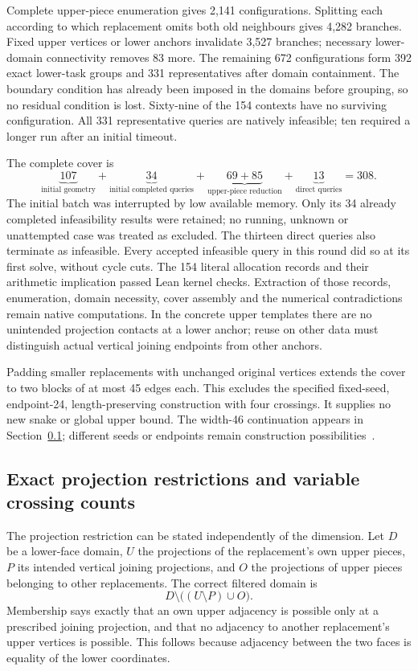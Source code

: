 \documentclass[11pt,a4paper]{article}
\theoremstyle{definition}
\theoremstyle{remark}
\begin{document}
Complete upper-piece enumeration gives 2,141 configurations. Splitting
each according to which replacement omits both old neighbours gives
4,282 branches. Fixed upper vertices or lower anchors invalidate 3,527
branches; necessary lower-domain connectivity removes 83 more. The
remaining 672 configurations form 392 exact lower-task groups and
331 representatives after domain containment. The boundary condition
has already been imposed in the domains before grouping, so no residual
condition is lost. Sixty-nine of the 154 contexts have no surviving
configuration. All 331 representative queries are natively infeasible;
ten required a longer run after an initial timeout.

The complete cover is
\[
\underbrace{107}_{\text{initial geometry}}+
\underbrace{34}_{\text{initial completed queries}}+
\underbrace{69+85}_{\text{upper-piece reduction}}+
\underbrace{13}_{\text{direct queries}}=308.
\]
The initial batch was interrupted by low available memory. Only its 34
already completed infeasibility results were retained; no running,
unknown or unattempted case was treated as excluded. The thirteen
direct queries also terminate as infeasible. Every accepted infeasible
query in this round did so at its first solve, without cycle cuts.
The 154 literal allocation records and their arithmetic implication
passed Lean kernel checks. Extraction of those records, enumeration,
domain necessity, cover assembly and the numerical contradictions remain
native computations. In the concrete upper templates there are no
unintended projection contacts at a lower anchor; reuse on other data
must distinguish actual vertical joining endpoints from other anchors.

Padding smaller replacements with unchanged original vertices extends
the cover to two blocks of at most 45 edges each. This excludes the
specified fixed-seed, endpoint-24, length-preserving construction with
four crossings. It supplies no new snake or global upper bound.
The width-46 continuation appears in Section~\ref{sec:projection229};
different seeds or endpoints remain construction possibilities~\cite{research228}.

\subsection{Exact projection restrictions and variable crossing counts}
\label{sec:projection229}
The projection restriction can be stated independently of the dimension.
Let $D$ be a lower-face domain, $U$ the projections of the replacement's
own upper pieces, $P$ its intended vertical joining projections, and $O$
the projections of upper pieces belonging to other replacements. The
correct filtered domain is
\[
D\setminus\bigl((U\setminus P)\cup O\bigr).
\]
Membership says exactly that an own upper adjacency is possible only
at a prescribed joining projection, and that no adjacency to another
replacement's upper vertices is possible. This follows because adjacency
between the two faces is equality of the lower coordinates.
\end{document}
